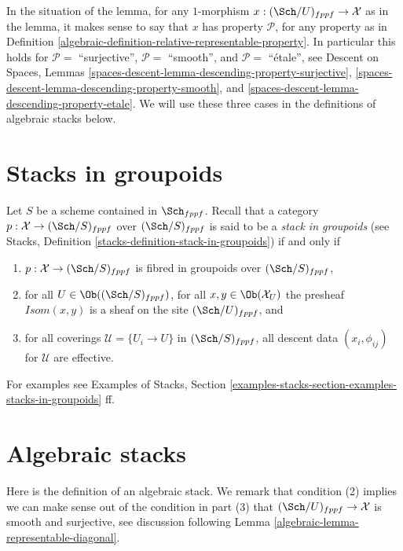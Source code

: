 In the situation of the lemma, for any $1$-morphism
$x : (\Sch/U)_{fppf} \to \mathcal{X}$ as in the lemma, it makes sense
to say that $x$ has property $\mathcal{P}$, for any property as in
Definition \ref{algebraic-definition-relative-representable-property}.
In particular this holds for
$\mathcal{P} = $ ``surjective'',
$\mathcal{P} = $ ``smooth'', and
$\mathcal{P} = $ ``\'etale'',
see
Descent on Spaces,
Lemmas \ref{spaces-descent-lemma-descending-property-surjective},
\ref{spaces-descent-lemma-descending-property-smooth}, and
\ref{spaces-descent-lemma-descending-property-etale}.
We will use these three cases in the definitions
of algebraic stacks below.

\section{Stacks in groupoids}
\label{algebraic-section-stacks}
Let $S$ be a scheme contained in $\Sch_{fppf}$.
Recall that a category $p : \mathcal{X} \to (\Sch/S)_{fppf}$
over $(\Sch/S)_{fppf}$ is said to be a
{\it stack in groupoids} (see
Stacks, Definition \ref{stacks-definition-stack-in-groupoids})
if and only if
\begin{enumerate}
\item $p : \mathcal{X} \to (\Sch/S)_{fppf}$ is fibred
in groupoids over $(\Sch/S)_{fppf}$,
\item for all $U \in \Ob((\Sch/S)_{fppf})$,
for all $x, y\in \Ob(\mathcal{X}_U)$ the presheaf
$\mathit{Isom}(x, y)$ is a sheaf on the site $(\Sch/U)_{fppf}$, and
\item for all coverings $\mathcal{U} = \{U_i \to U\}$ in
$(\Sch/S)_{fppf}$, all descent data $(x_i, \phi_{ij})$
for $\mathcal{U}$ are effective.
\end{enumerate}
For examples see
Examples of Stacks,
Section \ref{examples-stacks-section-examples-stacks-in-groupoids}
ff.

\section{Algebraic stacks}
\label{algebraic-section-algebraic-stacks}
Here is the definition of an algebraic stack. We remark that condition
(2) implies we can make sense out of the condition in part (3) that
$(\Sch/U)_{fppf} \to \mathcal{X}$
is smooth and surjective, see discussion following
Lemma \ref{algebraic-lemma-representable-diagonal}.

